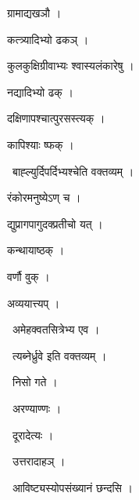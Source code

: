 \documentclass[10pt, openany, oneside]{book}
\begin{document}
\noindent ग्रामाद्यखञौ ।

\noindent कत्त्र्यादिभ्यो ढकञ् ।

\noindent कुलकुक्षिग्रीवाभ्यः श्वास्यलंकारेषु ।

\noindent नद्यादिभ्यो ढक् ।

\noindent दक्षिणापश्चात्पुरसस्त्यक् ।

\noindent कापिश्याः ष्फक् ।

\par\noindent\hspace{1.5em}{\vps वा॰}~{\qt बाह्ल्युर्दिपर्दिभ्यश्चेति वक्तव्यम् ।}

\noindent रंकोरमनुष्येऽण् च ।

\noindent द्युप्रागपागुदक्प्रतीचो यत् ।

\noindent कन्थायाष्ठक् ।

\noindent वर्णौ वुक् ।

\noindent अव्ययात्त्यप् ।

\par\noindent\hspace{1.5em}{\vps वा॰}~{\qt अमेहक्वतसित्रेभ्य एव ।}

\par\noindent\hspace{1.5em}{\vps वा॰}~{\qt त्यब्नेर्ध्रुवे इति वक्तव्यम् ।}

\par\noindent\hspace{1.5em}{\vps वा॰}~{\qt निसो गते ।}

\par\noindent\hspace{1.5em}{\vps वा॰}~{\qt अरण्याण्णः ।}

\par\noindent\hspace{1.5em}{\vps वा॰}~{\qt दूरादेत्यः ।}

\par\noindent\hspace{1.5em}{\vps वा॰}~{\qt उत्तरादाहञ् ।}

\par\noindent\hspace{1.5em}{\vps वा॰}~{\qt आविष्ट्यस्योपसंख्यानं छन्दसि ।}
\end{document}
